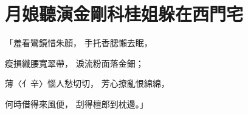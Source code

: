 %

\chapter{月娘聽演金剛科\KG 桂姐躲在西門宅}


\begin{showcontents}{}



「羞看鸞鏡惜朱顏，  手托香腮懶去眠，

瘦損纖腰寬翠帶，  淚流粉面落金鈿；

薄〈亻辛〉惱人愁切切，  芳心撩亂恨綿綿，

何時借得來風便，  刮得檀郎到枕邊。」


\end{showcontents}

